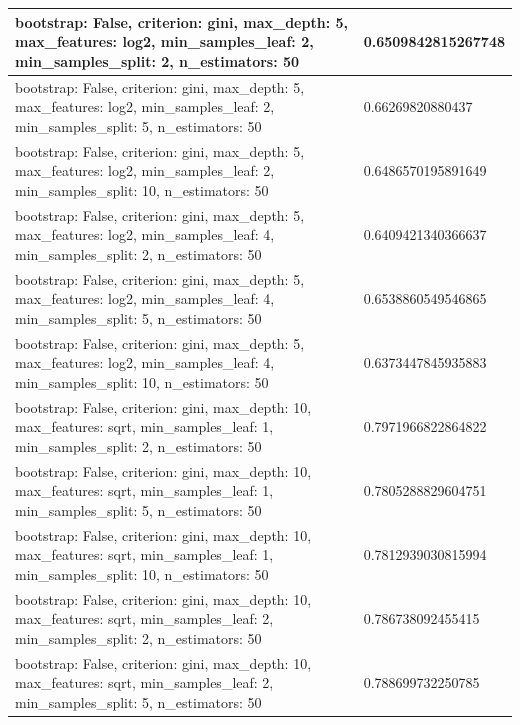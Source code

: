 \documentclass{report}
\begin{document}
{\begin{longtable}{|p{285.6px}|p{100.3px}|}
                    \hline
                    bootstrap: False, criterion: gini, max\_depth: 5, max\_features: log2, min\_samples\_leaf: 2, min\_samples\_split: 2, n\_estimators: 50 & 0.6509842815267748 \\
                    \hline
                    bootstrap: False, criterion: gini, max\_depth: 5, max\_features: log2, min\_samples\_leaf: 2, min\_samples\_split: 5, n\_estimators: 50 & 0.66269820880437 \\
                    \hline
                    bootstrap: False, criterion: gini, max\_depth: 5, max\_features: log2, min\_samples\_leaf: 2, min\_samples\_split: 10, n\_estimators: 50 & 0.6486570195891649 \\
                    \hline
                    bootstrap: False, criterion: gini, max\_depth: 5, max\_features: log2, min\_samples\_leaf: 4, min\_samples\_split: 2, n\_estimators: 50 & 0.6409421340366637 \\
                    \hline
                    bootstrap: False, criterion: gini, max\_depth: 5, max\_features: log2, min\_samples\_leaf: 4, min\_samples\_split: 5, n\_estimators: 50 & 0.6538860549546865 \\
                    \hline
                    bootstrap: False, criterion: gini, max\_depth: 5, max\_features: log2, min\_samples\_leaf: 4, min\_samples\_split: 10, n\_estimators: 50 & 0.6373447845935883 \\
                    \hline
                    bootstrap: False, criterion: gini, max\_depth: 10, max\_features: sqrt, min\_samples\_leaf: 1, min\_samples\_split: 2, n\_estimators: 50 & 0.7971966822864822 \\
                    \hline
                    bootstrap: False, criterion: gini, max\_depth: 10, max\_features: sqrt, min\_samples\_leaf: 1, min\_samples\_split: 5, n\_estimators: 50 & 0.7805288829604751 \\
                    \hline
                    bootstrap: False, criterion: gini, max\_depth: 10, max\_features: sqrt, min\_samples\_leaf: 1, min\_samples\_split: 10, n\_estimators: 50 & 0.7812939030815994 \\
                    \hline
                    bootstrap: False, criterion: gini, max\_depth: 10, max\_features: sqrt, min\_samples\_leaf: 2, min\_samples\_split: 2, n\_estimators: 50 & 0.786738092455415 \\
                    \hline
                    bootstrap: False, criterion: gini, max\_depth: 10, max\_features: sqrt, min\_samples\_leaf: 2, min\_samples\_split: 5, n\_estimators: 50 & 0.788699732250785 \\

\end{longtable}}
\end{document}
